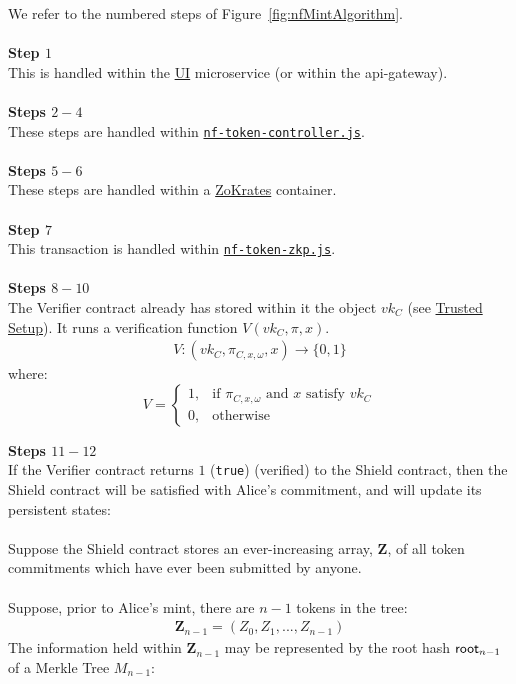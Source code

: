 We refer to the numbered steps of Figure~\ref{fig:nfMintAlgorithm}.\\
\\
\textbf{Step $1$}
\ \\
This is handled within the \hyperref[sec:ui]{UI} microservice (or within the api-gateway).\\
\\
\textbf{Steps $2 - 4$}
\ \\
These steps are handled within \hyperref[sec:nf-token-controller]{\texttt{nf-token-controller.js}}.\\
\\
\textbf{Steps $5 - 6$}
\ \\
These steps are handled within a \hyperref[sec:zokrates]{ZoKrates} container.\\
\\
\textbf{Step $7$}
\ \\
This transaction is handled within \hyperref[sec:nf-token-zkp]{\texttt{nf-token-zkp.js}}.\\
\\
\textbf{Steps $8 - 10$}
\ \\
The Verifier contract already has stored within it the object $vk_C$ (see \hyperref[sec:trustedSetup]{Trusted Setup}). It runs a verification function $V(vk_C, \pi , x)$.
\begin{align*}
  V: (vk_C, \pi_{C,x,\omega}, x) \to \{0,1\}
\end{align*}
where:
\[
    V=
\begin{cases}
    1,& \text{if } \pi_{C,x,\omega} \text{ and } x \text{ satisfy } vk_C\\
    0,& \text{otherwise}
\end{cases}
\]

\textbf{Steps $11 - 12$}
\ \\
If the Verifier contract returns $1$ (\texttt{true}) (verified) to the Shield contract, then the Shield contract will be satisfied with Alice's commitment, and will update its persistent states:\\
\\
Suppose the Shield contract stores an ever-increasing array, $\bm{Z}$, of all token commitments which have ever been submitted by anyone.\\
\\
Suppose, prior to Alice's mint, there are $n-1$ tokens in the tree:
\begin{align*}
  \bm{Z}_{n-1} = (Z_0, Z_1, ..., Z_{n-1})
\end{align*}
The information held within $\bm{Z}_{n-1}$ may be represented by the root hash $\mathsf{root}_{n-1}$ of a Merkle Tree $M_{n-1}$:\\


